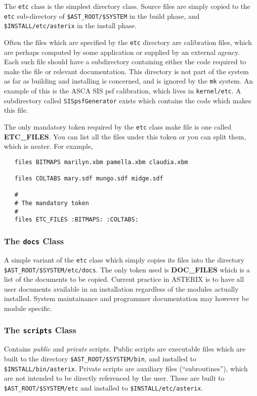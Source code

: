 The {\tt etc} class is the simplest directory class. Source files are
simply copied to the {\tt etc} sub-directory of \verb+$AST_ROOT/$SYSTEM+
in the build phase, and \verb+$INSTALL/etc/asterix+ in the install phase.

Often the files which are specified by the {\tt etc} directory are
calibration files, which are perhaps computed by some application or
supplied by an external agency. Each such file should have a subdirectory
containing either the code required to make the file or relevant
documentation. This directory
is not part of the system as far as building and installing is
concerned, and is ignored by the \verb+mk+ system. An example of this
is the ASCA SIS psf calibration, which lives in \verb+kernel/etc+. 
A subdirectory called \verb+SISpsfGenerator+ exists which contains
the code which makes this file.

The only mandatory token required by the \verb+etc+ class make file
is one called {\bf ETC\_FILES}. You can list all the files under this token
or you can split them, which is neater. For example,
\begin{verbatim}
   files BITMAPS marilyn.xbm pamella.xbm claudia.xbm
  
   files COLTABS mary.sdf mungo.sdf midge.sdf
  
   #
   # The mandatory token
   #
   files ETC_FILES :BITMAPS: :COLTABS:
\end{verbatim}
  
\subsubsection{The {\tt docs} Class}

A simple variant of the \verb+etc+ class which simply copies its files
into the directory \verb+$AST_ROOT/$SYSTEM/etc/docs+. The only token used
is {\bf DOC\_FILES} which is a list of the documents to be copied. Current
practice in ASTERIX is to have all user documents available in an installation
regardless of the modules actually installed. System maintainance and
programmer documentation may however be module specific.

\subsubsection{The {\tt scripts} Class}

Contains {\em public} and {\em private} scripts. Public scripts are
executable files which are built to the directory
\verb+$AST_ROOT/$SYSTEM/bin+,
and installed to \verb+$INSTALL/bin/asterix+. Private scripts are
auxiliary files (``subroutines''), which are not intended to be
directly referenced by the user. These are built to 
\verb+$AST_ROOT/$SYSTEM/etc+ and installed to \verb+$INSTALL/etc/asterix+.

